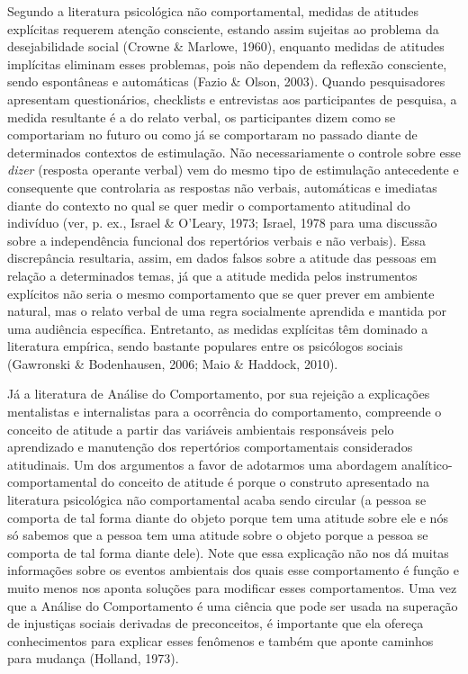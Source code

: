 Segundo a literatura psicológica não comportamental, medidas de atitudes explícitas requerem atenção consciente, estando assim sujeitas ao problema da desejabilidade social (Crowne \& Marlowe, 1960), enquanto medidas de atitudes implícitas eliminam esses problemas, pois não dependem da reflexão consciente, sendo espontâneas e automáticas (Fazio \& Olson, 2003). Quando pesquisadores apresentam questionários, checklists e entrevistas aos participantes de pesquisa, a medida resultante é a do relato verbal, os participantes dizem como se comportariam no futuro ou como já se comportaram no passado diante de determinados contextos de estimulação. Não necessariamente o controle sobre esse \textit{dizer} (resposta operante verbal) vem do mesmo tipo de estimulação antecedente e consequente que controlaria as respostas não verbais, automáticas e imediatas diante do contexto no qual se quer medir o comportamento atitudinal do indivíduo (ver, p. ex., Israel \& O'Leary, 1973; Israel, 1978 para uma discussão sobre a independência funcional dos repertórios verbais e não verbais). Essa discrepância resultaria, assim, em dados falsos sobre a atitude das pessoas em relação a determinados temas, já que a atitude medida pelos instrumentos explícitos não seria o mesmo comportamento que se quer prever em ambiente natural, mas o relato verbal de uma regra socialmente aprendida e mantida por uma audiência específica. Entretanto, as medidas explícitas têm dominado a literatura empírica, sendo bastante populares entre os psicólogos sociais (Gawronski \& Bodenhausen, 2006; Maio \& Haddock, 2010). 

Já a literatura de Análise do Comportamento, por sua rejeição a explicações mentalistas e internalistas para a ocorrência do comportamento, compreende o conceito de atitude a partir das variáveis ambientais responsáveis pelo aprendizado e manutenção dos repertórios comportamentais considerados atitudinais. Um dos argumentos a favor de adotarmos uma abordagem analítico-comportamental do conceito de atitude é porque o construto apresentado na literatura psicológica não comportamental acaba sendo circular (a pessoa se comporta de tal forma diante do objeto porque tem uma atitude sobre ele e nós só sabemos que a pessoa tem uma atitude sobre o objeto porque a pessoa se comporta de tal forma diante dele). Note que essa explicação não nos dá muitas informações sobre os eventos ambientais dos quais esse comportamento é função e muito menos nos aponta soluções para modificar esses comportamentos. Uma vez que a Análise do Comportamento é uma ciência que pode ser usada na superação de injustiças sociais derivadas de preconceitos, é importante que ela ofereça conhecimentos para explicar esses fenômenos e também que aponte caminhos para mudança (Holland, 1973).

